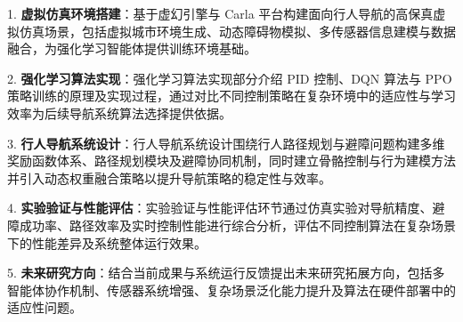 1. \textbf{虚拟仿真环境搭建}：基于虚幻引擎与 Carla 平台构建面向行人导航的高保真虚拟仿真场景，包括虚拟城市环境生成、动态障碍物模拟、多传感器信息建模与数据融合，为强化学习智能体提供训练环境基础。

2. \textbf{强化学习算法实现}：强化学习算法实现部分介绍 PID 控制、DQN 算法与 PPO 策略训练的原理及实现过程，通过对比不同控制策略在复杂环境中的适应性与学习效率为后续导航系统算法选择提供依据。

3. \textbf{行人导航系统设计}：行人导航系统设计围绕行人路径规划与避障问题构建多维奖励函数体系、路径规划模块及避障协同机制，同时建立骨骼控制与行为建模方法并引入动态权重融合策略以提升导航策略的稳定性与效率。

4. \textbf{实验验证与性能评估}：实验验证与性能评估环节通过仿真实验对导航精度、避障成功率、路径效率及实时控制性能进行综合分析，评估不同控制算法在复杂场景下的性能差异及系统整体运行效果。

5. \textbf{未来研究方向}：结合当前成果与系统运行反馈提出未来研究拓展方向，包括多智能体协作机制、传感器系统增强、复杂场景泛化能力提升及算法在硬件部署中的适应性问题。

